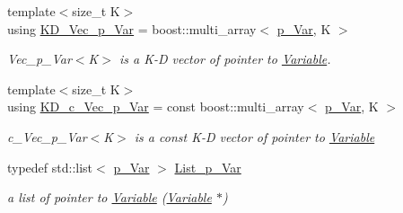 \begin{DoxyCompactItemize}
\mbox{\label{group___variable___t_y_p_e_s_ga5f11aac4e082749e08e2013196e258a5}} 
{\footnotesize template$<$size\+\_\+t K$>$ }\\using \mbox{\hyperlink{group___variable___t_y_p_e_s_ga5f11aac4e082749e08e2013196e258a5}{K\+D\+\_\+\+Vec\+\_\+p\+\_\+\+Var}} = boost\+::multi\+\_\+array$<$ \mbox{\hyperlink{group___variable___t_y_p_e_s_ga85b661f10ca1c046c5f496678213981a}{p\+\_\+\+Var}}, K $>$
\begin{DoxyCompactList}\small\item\em Vec\+\_\+p\+\_\+\+Var$<$\+K$>$ is a K-\/D vector of pointer to \mbox{\hyperlink{class_s_m_spp__di__unipi__it_1_1_variable}{Variable}}. \end{DoxyCompactList}\item 
\mbox{\label{group___variable___t_y_p_e_s_gaae074c01b1cf2e161e8b6b8cf1044d02}} 
{\footnotesize template$<$size\+\_\+t K$>$ }\\using \mbox{\hyperlink{group___variable___t_y_p_e_s_gaae074c01b1cf2e161e8b6b8cf1044d02}{K\+D\+\_\+c\+\_\+\+Vec\+\_\+p\+\_\+\+Var}} = const boost\+::multi\+\_\+array$<$ \mbox{\hyperlink{group___variable___t_y_p_e_s_ga85b661f10ca1c046c5f496678213981a}{p\+\_\+\+Var}}, K $>$
\begin{DoxyCompactList}\small\item\em c\+\_\+\+Vec\+\_\+p\+\_\+\+Var$<$\+K$>$ is a const K-\/D vector of pointer to \mbox{\hyperlink{class_s_m_spp__di__unipi__it_1_1_variable}{Variable}} \end{DoxyCompactList}\item 
\mbox{\label{group___variable___t_y_p_e_s_ga1fccfcb7d57847e2b9ba2fa0c6100b80}} 
typedef std\+::list$<$ \mbox{\hyperlink{group___variable___t_y_p_e_s_ga85b661f10ca1c046c5f496678213981a}{p\+\_\+\+Var}} $>$ \mbox{\hyperlink{group___variable___t_y_p_e_s_ga1fccfcb7d57847e2b9ba2fa0c6100b80}{List\+\_\+p\+\_\+\+Var}}
\begin{DoxyCompactList}\small\item\em a list of pointer to \mbox{\hyperlink{class_s_m_spp__di__unipi__it_1_1_variable}{Variable}} (\mbox{\hyperlink{class_s_m_spp__di__unipi__it_1_1_variable}{Variable}} $\ast$) \end{DoxyCompactList}\item 
\mbox{\label{group___variable___t_y_p_e_s_ga01b5f0523f638dd5836a17a6d5eb3d66}} 

\end{DoxyCompactItemize}
